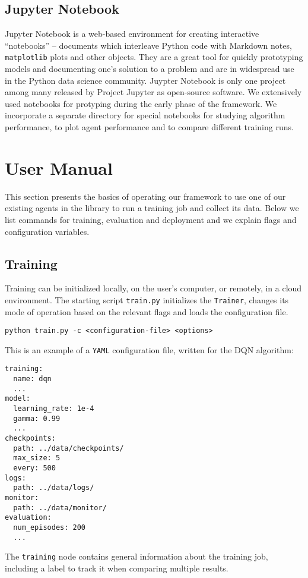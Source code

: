\subsection*{Jupyter Notebook}
Jupyter Notebook is a web-based environment for creating interactive ``notebooks'' -- documents which interleave Python code with Markdown notes, \texttt{matplotlib} plots and other objects.
They are a great tool for quickly prototyping models and documenting one's solution to a problem and are in widespread use in the Python data science community.
Juypter Notebook is only one project among many released by Project Jupyter as open-source software.
We extensively used notebooks for protyping during the early phase of the framework.
We incorporate a separate directory for special notebooks for studying algorithm performance, to plot agent performance and to compare different training runs.

\section{User Manual} \label{section:user-manual}
This section presents the basics of operating our framework to use one of our existing agents in the library to run a training job and collect its data.
Below we list commands for training, evaluation and deployment and we explain flags and configuration variables.

\subsection*{Training}
Training can be initialized locally, on the user's computer, or remotely, in a cloud environment.
The starting script \verb|train.py| initializes the \verb|Trainer|, changes its mode of operation based on the relevant flags and loads the configuration file.
\begin{verbatim}
python train.py -c <configuration-file> <options>
\end{verbatim}

This is an example of a \verb|YAML| configuration file, written for the DQN algorithm:
\begin{verbatim}
training:
  name: dqn
  ...
model:
  learning_rate: 1e-4
  gamma: 0.99
  ...
checkpoints:
  path: ../data/checkpoints/
  max_size: 5
  every: 500
logs:
  path: ../data/logs/
monitor:
  path: ../data/monitor/
evaluation:
  num_episodes: 200
  ...
\end{verbatim}

The \verb|training| node contains general information about the training job, including a label to track it when comparing multiple results.

